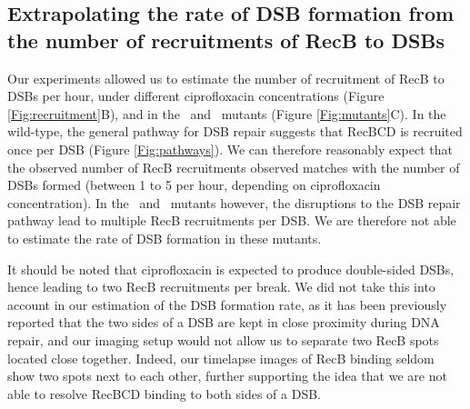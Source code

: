 \subsection*{Extrapolating the rate of DSB formation from the number of recruitments of RecB to DSBs}
Our experiments allowed us to estimate the number of recruitment of RecB to DSBs per hour, under different ciprofloxacin concentrations (Figure \ref{Fig:recruitment}B), and in the \dreca\ and \teneighty\ mutants (Figure \ref{Fig:mutants}C). In the wild-type, the general pathway for DSB repair suggests that RecBCD is recruited once per DSB (Figure \ref{Fig:pathways}). We can therefore reasonably expect that the observed number of RecB recruitments observed matches with the number of DSBs formed (between 1 to 5 per hour, depending on ciprofloxacin concentration). In the \dreca\ and \teneighty\ mutants however, the disruptions to the DSB repair pathway lead to multiple RecB recruitments per DSB. We are therefore not able to estimate the rate of DSB formation in these mutants.

It should be noted that ciprofloxacin is expected to produce double-sided DSBs, hence leading to two RecB recruitments per break. We did not take this into account in our estimation of the DSB formation rate, as it has been previously reported that the two sides of a DSB are kept in close proximity during DNA repair, and our imaging setup would not allow us to separate two RecB spots located close together. Indeed, our timelapse images of RecB binding seldom show two spots next to each other, further supporting the idea that we are not able to resolve RecBCD binding to both sides of a DSB.
